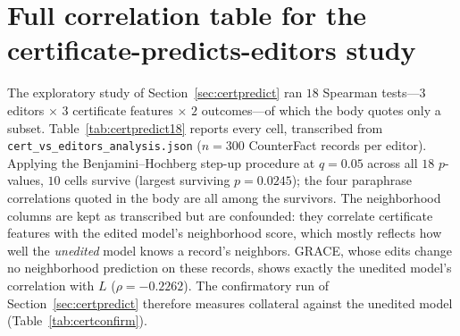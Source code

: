 \documentclass[10pt,twocolumn]{article}
\theoremstyle{remark}
\begin{document}
\section{Full correlation table for the certificate-predicts-editors study}
\label{app:certpredict18}

The exploratory study of Section~\ref{sec:certpredict} ran $18$ Spearman
tests---$3$ editors $\times$ $3$ certificate features $\times$ $2$
outcomes---of which the body quotes only a subset. Table~\ref{tab:certpredict18}
reports every cell, transcribed from
\texttt{cert\_vs\_editors\_analysis.json} ($n=300$ CounterFact records per
editor). Applying the Benjamini--Hochberg step-up procedure at $q=0.05$ across
all $18$ $p$-values, $10$ cells survive (largest surviving $p=0.0245$); the four
paraphrase correlations quoted in the body are all among the survivors. The
neighborhood columns are kept as transcribed but are confounded: they
correlate certificate features with the edited model's neighborhood score,
which mostly reflects how well the \emph{unedited} model knows a record's
neighbors. GRACE, whose edits change no neighborhood prediction on these
records, shows exactly the unedited model's correlation with $L$
($\rho=-0.2262$). The confirmatory run of Section~\ref{sec:certpredict}
therefore measures collateral against the unedited model
(Table~\ref{tab:certconfirm}).
\end{document}
